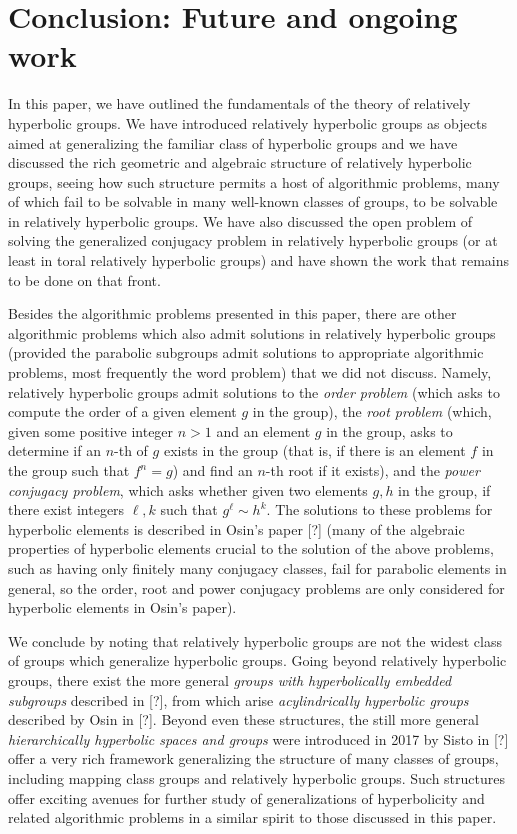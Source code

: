 \documentclass[12pt]{article}
\newcommand{\vs}{\vskip10pt}
\begin{document}
	\newpage
	
	\section{Conclusion: Future and ongoing work}
	
	In this paper, we have outlined the fundamentals of the theory of relatively hyperbolic groups. We have introduced relatively hyperbolic groups as objects aimed at generalizing the familiar class of hyperbolic groups and we have discussed the rich geometric and algebraic structure of relatively hyperbolic groups, seeing how such structure permits a host of algorithmic problems, many of which fail to be solvable in many well-known classes of groups, to be solvable in relatively hyperbolic groups. We have also discussed the open problem of solving the generalized conjugacy problem in relatively hyperbolic groups (or at least in toral relatively hyperbolic groups) and have shown the work that remains to be done on that front. 
	
	\vs 
	
	Besides the algorithmic problems presented in this paper, there are other algorithmic problems which also admit solutions in relatively hyperbolic groups (provided the parabolic subgroups admit solutions to appropriate algorithmic problems, most frequently the word problem) that we did not discuss. Namely, relatively hyperbolic groups admit solutions to the \textit{order problem} (which asks to compute the order of a given element $g$ in the group), the \textit{root problem} (which, given some positive integer $n > 1$ and an element $g$ in the group, asks to determine if an $n$-th of $g$ exists in the group (that is, if there is an element $f$ in the group such that $f^n = g$) and find an $n$-th root if it exists), and the \textit{power conjugacy problem}, which asks whether given two elements $g,h$ in the group, if there exist integers $\ell, k$ such that $g^{\ell} \sim h^k$. The solutions to these problems for hyperbolic elements is described in Osin's paper [?] (many of the algebraic properties of hyperbolic elements crucial to the solution of the above problems, such as having only finitely many conjugacy classes, fail for parabolic elements in general, so the order, root and power conjugacy problems are only considered for hyperbolic elements in Osin's paper). 
	
	\vs 
	
	We conclude by noting that relatively hyperbolic groups are not the widest class of groups which generalize hyperbolic groups. Going beyond relatively hyperbolic groups, there exist the more general \textit{groups with hyperbolically embedded subgroups} described in [?], from which arise \textit{acylindrically hyperbolic groups} described by Osin in [?]. Beyond even these structures, the still more general \textit{hierarchically hyperbolic spaces and groups} were introduced in 2017 by Sisto in [?] offer a very rich framework generalizing the structure of many classes of groups, including mapping class groups and relatively hyperbolic groups. Such structures offer exciting avenues for further study of generalizations of hyperbolicity and related algorithmic problems in a similar spirit to those discussed in this paper. 
	
\end{document}
